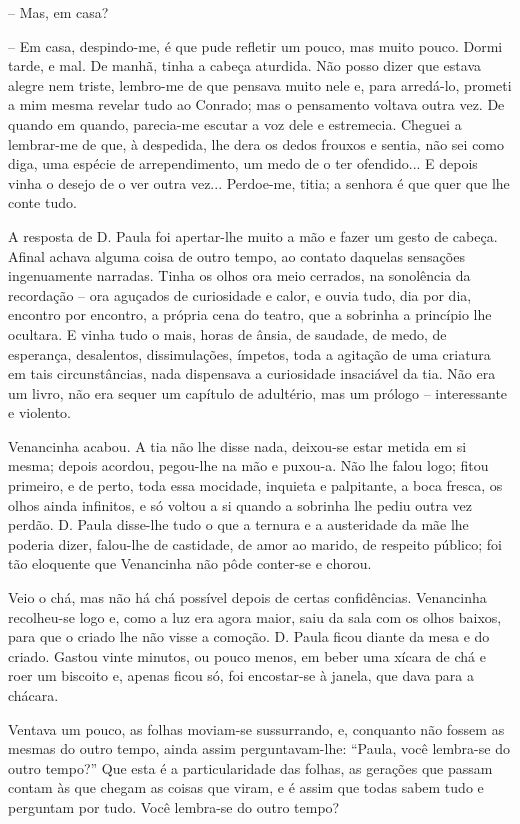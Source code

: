 -- Mas, em casa?

-- Em casa, despindo-me, é que pude refletir um pouco, mas muito pouco.
Dormi tarde, e mal. De manhã, tinha a cabeça aturdida. Não posso dizer
que estava alegre nem triste, lembro-me de que pensava muito nele e,
para arredá-lo, prometi a mim mesma revelar tudo ao Conrado; mas o
pensamento voltava outra vez. De quando em quando, parecia-me escutar a
voz dele e estremecia. Cheguei a lembrar-me de que, à despedida, lhe
dera os dedos frouxos e sentia, não sei como diga, uma espécie de
arrependimento, um medo de o ter ofendido... E depois vinha o desejo de
o ver outra vez... Perdoe-me, titia; a senhora é que quer que lhe conte
tudo.

A resposta de D. Paula foi apertar-lhe muito a mão e fazer um gesto de
cabeça. Afinal achava alguma coisa de outro tempo, ao contato daquelas
sensações ingenuamente narradas. Tinha os olhos ora meio cerrados, na
sonolência da recordação -- ora aguçados de curiosidade e calor, e ouvia
tudo, dia por dia, encontro por encontro, a própria cena do teatro, que
a sobrinha a princípio lhe ocultara. E vinha tudo o mais, horas de
ânsia, de saudade, de medo, de esperança, desalentos, dissimulações,
ímpetos, toda a agitação de uma criatura em tais circunstâncias, nada
dispensava a curiosidade insaciável da tia. Não era um livro, não era
sequer um capítulo de adultério, mas um prólogo -- interessante e
violento.

Venancinha acabou. A tia não lhe disse nada, deixou-se estar metida em
si mesma; depois acordou, pegou-lhe na mão e puxou-a. Não lhe falou
logo; fitou primeiro, e de perto, toda essa mocidade, inquieta e
palpitante, a boca fresca, os olhos ainda infinitos, e só voltou a si
quando a sobrinha lhe pediu outra vez perdão. D. Paula disse-lhe tudo o
que a ternura e a austeridade da mãe lhe poderia dizer, falou-lhe de
castidade, de amor ao marido, de respeito público; foi tão eloquente que
Venancinha não pôde conter-se e chorou.

Veio o chá, mas não há chá possível depois de certas confidências.
Venancinha recolheu-se logo e, como a luz era agora maior, saiu da sala
com os olhos baixos, para que o criado lhe não visse a comoção. D. Paula
ficou diante da mesa e do criado. Gastou vinte minutos, ou pouco menos,
em beber uma xícara de chá e roer um biscoito e, apenas ficou só, foi
encostar-se à janela, que dava para a chácara.

Ventava um pouco, as folhas moviam-se sussurrando, e, conquanto não
fossem as mesmas do outro tempo, ainda assim perguntavam-lhe: ``Paula,
você lembra-se do outro tempo?'' Que esta é a particularidade das
folhas, as gerações que passam contam às que chegam as coisas que viram,
e é assim que todas sabem tudo e perguntam por tudo. Você lembra-se do
outro tempo?

